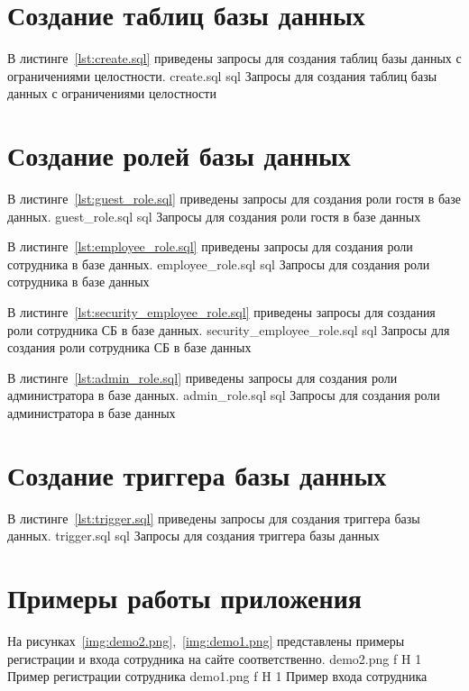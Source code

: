 \section{Создание таблиц базы данных}

В листинге~\ref{lst:create.sql} приведены запросы для создания таблиц базы данных с ограничениями целостности.
	{create.sql}
	{sql}
	{Запросы для создания таблиц базы данных с ограничениями целостности}

\section{Создание ролей базы данных}

В листинге~\ref{lst:guest_role.sql} приведены запросы для создания роли гостя в базе данных.
	{guest_role.sql}
	{sql}
	{Запросы для создания роли гостя в базе данных}

В листинге~\ref{lst:employee_role.sql} приведены запросы для создания роли сотрудника в базе данных.
	{employee_role.sql}
	{sql}
	{Запросы для создания роли сотрудника в базе данных}
	
В листинге~\ref{lst:security_employee_role.sql} приведены запросы для создания роли сотрудника СБ в базе данных.
	{security_employee_role.sql}
	{sql}
	{Запросы для создания роли сотрудника СБ в базе данных}
	
В листинге~\ref{lst:admin_role.sql} приведены запросы для создания роли администратора в базе данных.
	{admin_role.sql}
	{sql}
	{Запросы для создания роли администратора в базе данных}

\section{Создание триггера базы данных}

В листинге~\ref{lst:trigger.sql} приведены запросы для создания триггера базы данных.
	{trigger.sql}
	{sql}
	{Запросы для создания триггера базы данных}

\section{Примеры работы приложения}

На рисунках~\ref{img:demo2.png},~\ref{img:demo1.png} представлены примеры регистрации и входа сотрудника на сайте соответственно.
	{demo2.png}
	{f}
	{H}
	{1\textwidth}
	{Пример регистрации сотрудника}
	{demo1.png}
	{f}
	{H}
	{1\textwidth}
	{Пример входа сотрудника}

